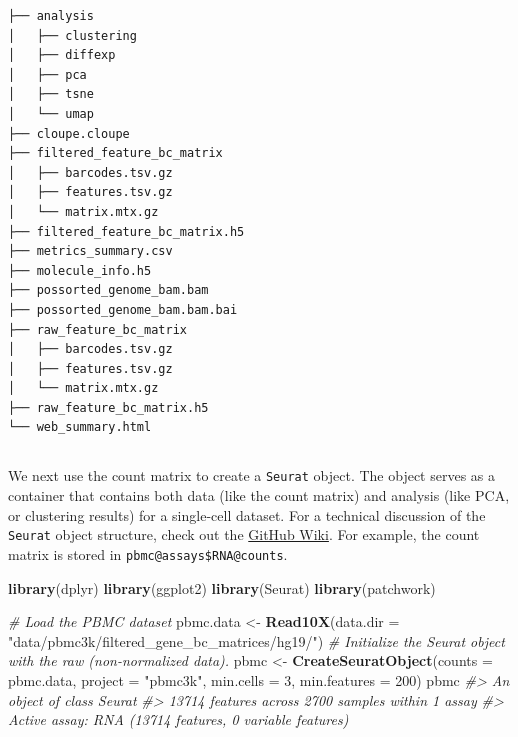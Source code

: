 \documentclass[
]{book}
\newenvironment{Shaded}{\begin{snugshade}}{\end{snugshade}}
\newcommand{\AttributeTok}[1]{\textcolor[rgb]{0.13,0.29,0.53}{#1}}
\newcommand{\CommentTok}[1]{\textcolor[rgb]{0.56,0.35,0.01}{\textit{#1}}}
\newcommand{\DecValTok}[1]{\textcolor[rgb]{0.00,0.00,0.81}{#1}}
\newcommand{\FunctionTok}[1]{\textcolor[rgb]{0.13,0.29,0.53}{\textbf{#1}}}
\newcommand{\NormalTok}[1]{#1}
\newcommand{\OtherTok}[1]{\textcolor[rgb]{0.56,0.35,0.01}{#1}}
\newcommand{\StringTok}[1]{\textcolor[rgb]{0.31,0.60,0.02}{#1}}
\begin{document}
\begin{verbatim}
├── analysis
│   ├── clustering
│   ├── diffexp
│   ├── pca
│   ├── tsne
│   └── umap
├── cloupe.cloupe
├── filtered_feature_bc_matrix
│   ├── barcodes.tsv.gz
│   ├── features.tsv.gz
│   └── matrix.mtx.gz
├── filtered_feature_bc_matrix.h5
├── metrics_summary.csv
├── molecule_info.h5
├── possorted_genome_bam.bam
├── possorted_genome_bam.bam.bai
├── raw_feature_bc_matrix
│   ├── barcodes.tsv.gz
│   ├── features.tsv.gz
│   └── matrix.mtx.gz
├── raw_feature_bc_matrix.h5
└── web_summary.html
\end{verbatim}

\hypertarget{section}{%
\subsection*{}\label{section}}

We next use the count matrix to create a \texttt{Seurat} object. The object serves as a container that contains both data (like the count matrix) and analysis (like PCA, or clustering results) for a single-cell dataset. For a technical discussion of the \texttt{Seurat} object structure, check out the \href{https://github.com/satijalab/seurat/wiki}{GitHub Wiki}. For example, the count matrix is stored in \texttt{pbmc@assays\$RNA@counts}.

\begin{Shaded}
\begin{Highlighting}[]
\FunctionTok{library}\NormalTok{(dplyr)}
\FunctionTok{library}\NormalTok{(ggplot2)}
\FunctionTok{library}\NormalTok{(Seurat)}
\FunctionTok{library}\NormalTok{(patchwork)}
\end{Highlighting}
\end{Shaded}

\begin{Shaded}
\begin{Highlighting}[]
\CommentTok{\# Load the PBMC dataset}
\NormalTok{pbmc.data }\OtherTok{\textless{}{-}} \FunctionTok{Read10X}\NormalTok{(}\AttributeTok{data.dir =} \StringTok{"data/pbmc3k/filtered\_gene\_bc\_matrices/hg19/"}\NormalTok{)}
\CommentTok{\# Initialize the Seurat object with the raw (non{-}normalized data).}
\NormalTok{pbmc }\OtherTok{\textless{}{-}} \FunctionTok{CreateSeuratObject}\NormalTok{(}\AttributeTok{counts =}\NormalTok{ pbmc.data, }\AttributeTok{project =} \StringTok{"pbmc3k"}\NormalTok{, }\AttributeTok{min.cells =} \DecValTok{3}\NormalTok{, }\AttributeTok{min.features =} \DecValTok{200}\NormalTok{)}
\NormalTok{pbmc}
\CommentTok{\#\textgreater{} An object of class Seurat }
\CommentTok{\#\textgreater{} 13714 features across 2700 samples within 1 assay }
\CommentTok{\#\textgreater{} Active assay: RNA (13714 features, 0 variable features)}
\end{Highlighting}
\end{Shaded}
\end{document}
